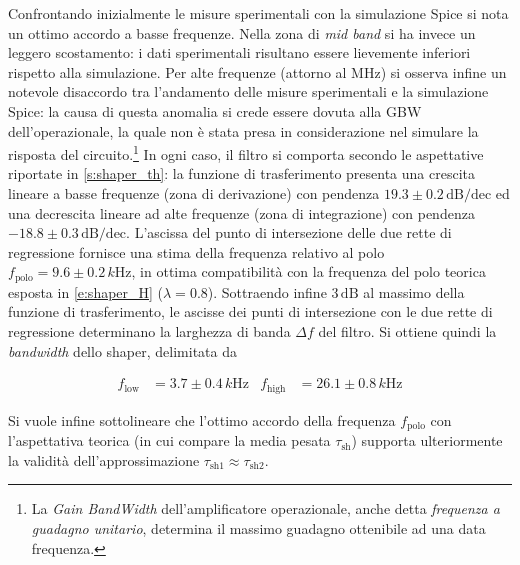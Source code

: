 \documentclass[a4paper,11pt]{article} %
\begin{document}
Confrontando inizialmente le misure sperimentali con la simulazione Spice si nota un ottimo accordo a basse frequenze.
Nella zona di \textit{mid band} si ha invece un leggero scostamento: i dati sperimentali risultano essere lievemente
inferiori rispetto alla simulazione. Per alte frequenze (attorno al MHz) si osserva infine un notevole disaccordo tra
l'andamento delle misure sperimentali e la simulazione Spice: la causa di questa anomalia si crede essere dovuta alla
GBW dell'operazionale, la quale non è stata presa in considerazione nel simulare la risposta del circuito.\footnote{La
\textit{Gain BandWidth} dell'amplificatore operazionale, anche detta \textit{frequenza a guadagno unitario}, determina
il massimo guadagno ottenibile ad una data frequenza.} In ogni caso, il filtro si comporta secondo le aspettative
riportate in \autoref{s:shaper_th}: la funzione di trasferimento presenta una crescita lineare a basse frequenze (zona
di derivazione) con pendenza $19.3 \pm 0.2 \,\text{dB/dec}$ ed una decrescita lineare ad alte frequenze (zona di
integrazione) con pendenza $-18.8 \pm 0.3 \,\text{dB/dec}$. L'ascissa del punto di intersezione delle due rette di
regressione fornisce una stima della frequenza relativo al polo $f_{\text{polo}} = 9.6 \pm 0.2 \,\si{k\Hz}$, in ottima
compatibilità con la frequenza del polo teorica esposta in \autoref{e:shaper_H} ($\lambda = 0.8$). Sottraendo infine
$3\,\text{dB}$ al massimo della funzione di trasferimento, le ascisse dei punti di intersezione con le due rette di
regressione determinano la larghezza di banda $\Delta f$ del filtro. Si ottiene quindi la \textit{bandwidth} dello
shaper, delimitata da 

\begin{align}\label{e:shaper_bw} 
	f_{\text{low}} &= 3.7 \pm 0.4 \,\si{k\Hz} 
	& 
	f_{\text{high}} &= 26.1 \pm 0.8\,\si{k\Hz} 
\end{align}

Si vuole infine sottolineare che l'ottimo accordo della frequenza $f_{\text{polo}}$ con l'aspettativa teorica (in cui
compare la media pesata $\tau_{\text{sh}}$) supporta ulteriormente la validità dell'approssimazione $\tau_{\text{sh}1}
\approx \tau_{\text{sh}2}$.

\end{document}
